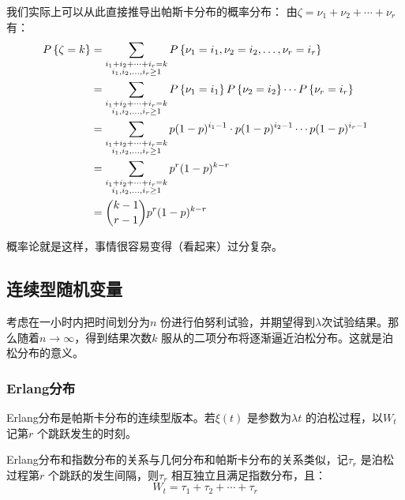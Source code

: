我们实际上可以从此直接推导出帕斯卡分布的概率分布：
由\(\zeta = \nu_{1} + \nu_{2} + \cdots + \nu_{r}\) 有：
\begin{align*}
    \P{\zeta=k} &=
    \sum_{\substack{i_{1}+i_{2}+\dots +i_{r}=k
    \\ i_{1},i_{2},\ldots,i_{r}\geq 1}} \P{\nu_{1}=i_{1},
    \nu_{2}=i_{2}, \ldots, \nu_{r}=i_{r}} \\
    &=\sum_{\substack{i_{1}+i_{2}+\dots +i_{r}=k
    \\ i_{1},i_{2},\ldots,i_{r}\geq 1}} P\left\{
    \nu_{1}=i_{1}\right\} \P{ \nu_{2}=i_{2} }
    \cdots \P{ \nu_{r}=i_{r} } \\
    &= \sum_{\substack{i_{1}+i_{2}+\dots +i_{r}=k
    \\ i_{1},i_{2},\ldots,i_{r}\geq 1}} p(1-p)^{i_{1}-1}
    \cdot p(1-p)^{i_{2}-1} \cdots p(1-p)^{i_{r}-1} \\
    &= \sum_{\substack{i_{1}+i_{2}+\dots +i_{r}=k
    \\ i_{1},i_{2},\ldots,i_{r}\geq 1}} p^{r} (1-p)^{k-r} \\
    &= \binom{k-1}{r-1} p^{r} (1-p)^{k-r}
\end{align*}

概率论就是这样，事情很容易变得（看起来）过分复杂。

\subsection{连续型随机变量}
考虑在一小时内把时间划分为\(n\) 份进行伯努利试验，并期望得到\(\lambda\)次试验结果。那么随着\(n
\to \infty\)，得到结果次数\(k\) 服从的二项分布将逐渐逼近泊松分布。这就是泊松分布的意义。

\subsubsection{Erlang分布} Erlang分布是帕斯卡分布的连续型版本。若\(\xi(t)\)
是参数为\(\lambda t\) 的泊松过程，以\(W_{t}\) 记第\(r\) 个跳跃发生的时刻。

Erlang分布和指数分布的关系与几何分布和帕斯卡分布的关系类似，记\(\tau_{r}\) 是泊松过程第\(r\)
个跳跃的发生间隔，则\(\tau_{r}\) 相互独立且满足指数分布，且：
\[
    W_{t} = \tau_{1} + \tau_{2} + \cdots + \tau_{r}
\]

